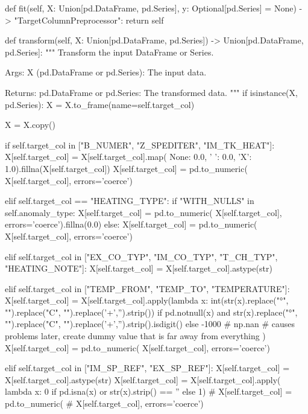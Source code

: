 {{    def fit(self, X: Union[pd.DataFrame, pd.Series], y: Optional[pd.Series] = None) -> "TargetColumnPreprocessor":
        return self

    def transform(self, X: Union[pd.DataFrame, pd.Series]) -> Union[pd.DataFrame, pd.Series]:
        """
        Transform the input DataFrame or Series.

        Args:
            X (pd.DataFrame or pd.Series): The input data.

        Returns:
            pd.DataFrame or pd.Series: The transformed data.
        """
        if isinstance(X, pd.Series):
            X = X.to_frame(name=self.target_col)

        X = X.copy()

        if self.target_col in ["B_NUMER", "Z_SPEDITER", "IM_TK_HEAT"]:
            X[self.target_col] = X[self.target_col].map(
                {None: 0.0, ' ': 0.0, 'X': 1.0}).fillna(X[self.target_col])
            X[self.target_col] = pd.to_numeric(
                X[self.target_col], errors='coerce')

        elif self.target_col == "HEATING_TYPE":
            if "WITH_NULLS" in self.anomaly_type:
                X[self.target_col] = pd.to_numeric(
                    X[self.target_col], errors='coerce').fillna(0.0)
            else:
                X[self.target_col] = pd.to_numeric(
                    X[self.target_col], errors='coerce')

        elif self.target_col in ["EX_CO_TYP", "IM_CO_TYP", "T_CH_TYP", "HEATING_NOTE"]:
            X[self.target_col] = X[self.target_col].astype(str)

        elif self.target_col in ["TEMP_FROM", "TEMP_TO", "TEMPERATURE"]:
            X[self.target_col] = X[self.target_col].apply(lambda x: int(str(x).replace("°", "").replace("C", "").replace('+','').strip()) 
                    if pd.notnull(x) and str(x).replace("°", "").replace("C", "").replace('+','').strip().isdigit() 
                    else -1000 # np.nan # causes problems later, create dummy value that is far away from everything
                    )
            X[self.target_col] = pd.to_numeric(
                X[self.target_col], errors='coerce')

        elif self.target_col in ["IM_SP_REF", "EX_SP_REF"]:
            X[self.target_col] = X[self.target_col].astype(str)
            X[self.target_col] = X[self.target_col].apply(
                lambda x: 0 if pd.isna(x) or str(x).strip() == '' else 1)
            # X[self.target_col] = pd.to_numeric(
            #     X[self.target_col], errors='coerce')

}}
